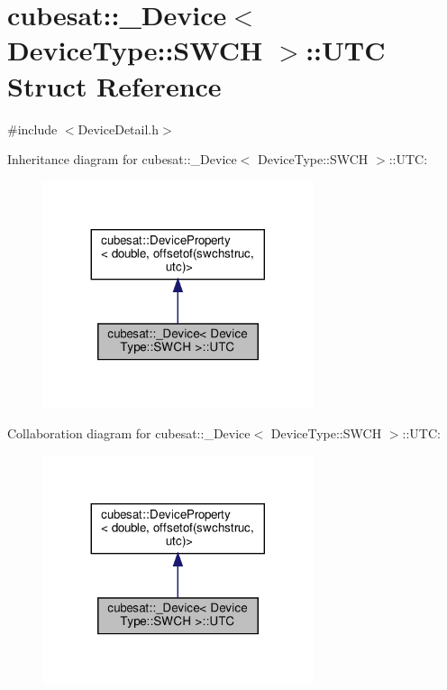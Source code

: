 \hypertarget{structcubesat_1_1__Device_3_01DeviceType_1_1SWCH_01_4_1_1UTC}{}\section{cubesat\+:\+:\+\_\+\+Device$<$ Device\+Type\+:\+:S\+W\+CH $>$\+:\+:U\+TC Struct Reference}
\label{structcubesat_1_1__Device_3_01DeviceType_1_1SWCH_01_4_1_1UTC}


{\ttfamily \#include $<$Device\+Detail.\+h$>$}



Inheritance diagram for cubesat\+:\+:\+\_\+\+Device$<$ Device\+Type\+:\+:S\+W\+CH $>$\+:\+:U\+TC\+:\nopagebreak
\begin{figure}[H]
\begin{center}
\leavevmode
\includegraphics[width=224pt]{structcubesat_1_1__Device_3_01DeviceType_1_1SWCH_01_4_1_1UTC__inherit__graph}
\end{center}
\end{figure}


Collaboration diagram for cubesat\+:\+:\+\_\+\+Device$<$ Device\+Type\+:\+:S\+W\+CH $>$\+:\+:U\+TC\+:\nopagebreak
\begin{figure}[H]
\begin{center}
\leavevmode
\includegraphics[width=224pt]{structcubesat_1_1__Device_3_01DeviceType_1_1SWCH_01_4_1_1UTC__coll__graph}
\end{center}
\end{figure}
